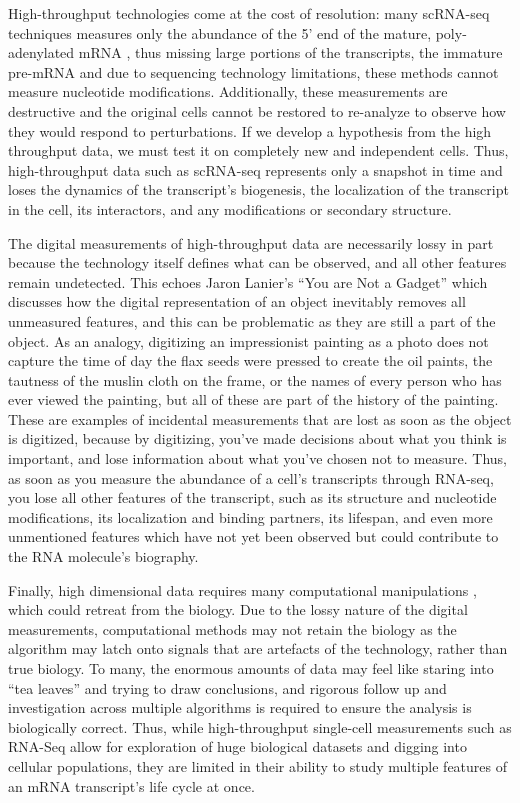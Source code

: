 High-throughput technologies come at the cost of resolution: many scRNA-seq techniques measures only the abundance of the 5' end of the mature, poly-adenylated mRNA  \cite{Kolodziejczyk2015-wj,Macosko2015-rl,Ziegenhain2016-gb}, thus missing large portions of the transcripts, the immature pre-mRNA and due to sequencing technology limitations, these methods cannot measure nucleotide modifications. Additionally, these measurements are destructive and the original cells cannot be restored to re-analyze to observe how they would respond to perturbations. If we develop a hypothesis from the high throughput data, we must test it on completely new and independent cells. Thus, high-throughput data such as scRNA-seq represents only a snapshot in time and loses the dynamics of the transcript's biogenesis, the localization of the transcript in the cell, its interactors, and any modifications or secondary structure.

The digital measurements of high-throughput data are necessarily lossy in part because the technology itself defines what can be observed, and all other features remain undetected. This echoes Jaron Lanier's ``You are Not a Gadget''  \cite{Jaron2010-hk} which discusses how the digital representation of an object inevitably removes all unmeasured features, and this can be problematic as they are still a part of the object. As an analogy, digitizing an impressionist painting as a photo does not capture the time of day the flax seeds were pressed to create the oil paints, the tautness of the muslin cloth on the frame, or the names of every person who has ever viewed the painting, but all of these are part of the history of the painting. These are examples of incidental measurements that are lost as soon as the object is digitized, because by digitizing, you've made decisions about what you think is important, and lose information about what you've chosen not to measure. Thus, as soon as you measure the abundance of a cell's transcripts through RNA-seq, you lose all other features of the transcript, such as its structure and nucleotide modifications, its localization and binding partners, its lifespan, and even more unmentioned features which have not yet been observed but could contribute to the RNA molecule's biography.


Finally, high dimensional data requires many computational manipulations  \cite{Bacher2016-ze,Cannoodt2016-mt,Stegle2015-tl}, which could retreat from the biology. Due to the lossy nature of the digital measurements, computational methods may not retain the biology as the algorithm may latch onto signals that are artefacts of the technology, rather than true biology. To many, the enormous amounts of data may feel like staring into ``tea leaves'' and trying to draw conclusions, and rigorous follow up and investigation across multiple algorithms is required to ensure the analysis is biologically correct. Thus, while high-throughput single-cell measurements such as RNA-Seq allow for exploration of huge biological datasets and digging into cellular populations, they are limited in their ability to study multiple features of an mRNA transcript's life cycle at once.

